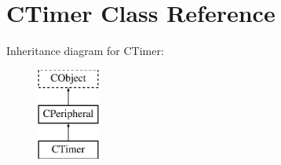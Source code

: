 \hypertarget{class_c_timer}{\section{C\-Timer Class Reference}
\label{class_c_timer}
}
Inheritance diagram for C\-Timer\-:\begin{figure}[H]
\begin{center}
\leavevmode
\includegraphics[height=3.000000cm]{class_c_timer}
\end{center}
\end{figure}
